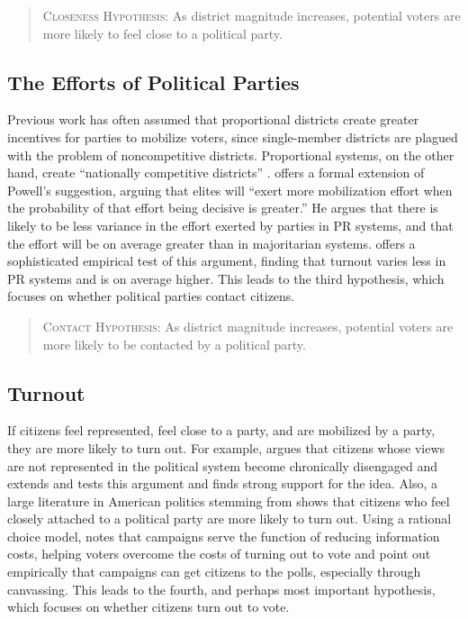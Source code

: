 \documentclass[12pt]{article}
\begin{document}
\begin{quote}
        \textsc{Closeness Hypothesis:} As district magnitude increases, potential voters are more likely to feel close to a political party.
\end{quote}

\subsection*{The Efforts of Political Parties}

Previous work has often assumed that proportional districts create greater incentives for parties to mobilize voters, since single-member districts are plagued with the problem of noncompetitive districts. Proportional systems, on the other hand, create ``nationally competitive districts'' \citep[though see \citealt{Rainey2015}]{Powell1982}. \cite{Cox1999} offers a formal extension of Powell's suggestion, arguing that elites will ``exert more mobilization effort when the probability of that effort being decisive is greater.'' He argues that there is likely to be less variance in the effort exerted by parties in PR systems, and that the effort will be on average greater than in majoritarian systems. \cite{Selb2009} offers a sophisticated empirical test of this argument, finding that turnout varies less in PR systems and is on average higher. This leads to the third hypothesis, which focuses on whether political parties contact citizens.

\begin{quote}
        \textsc{Contact Hypothesis:} As district magnitude increases, potential voters are more likely to be contacted by a political party.
\end{quote}

\subsection*{Turnout}

If citizens feel represented, feel close to a party, and are mobilized by a party, they are more likely to turn out. For example, \cite{Schattschneider1960} argues that citizens whose views are not represented in the political system become chronically disengaged and \cite{Solt2008, Solt2010} extends and tests this argument and finds strong support for the idea. Also, a large literature in American politics stemming from \cite{Campbelletal1960} shows that citizens who feel closely attached to a political party are more likely to turn out. Using a rational choice model, \cite{Downs1957} notes that campaigns serve the function of reducing information costs, helping voters overcome the costs of turning out to vote and \cite{GerberGreen2000} point out empirically that campaigns can get citizens to the polls, especially through canvassing. This leads to the fourth, and perhaps most important hypothesis, which focuses on whether citizens turn out to vote.
\end{document}
